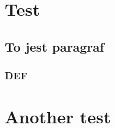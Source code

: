 \documentclass[polski]{amuthesis}
\begin{document}
\tableofcontents

\chapter{Test}

\lipsum[1]

\section{To jest paragraf}

\lipsum[2-3]

\subsection{DEF}

\lipsum[4]

\chapter{Another test}
\end{document}
